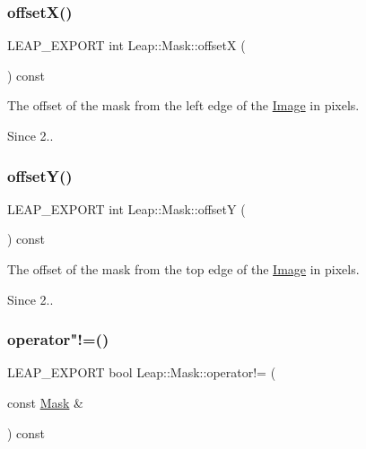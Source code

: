 \subsubsection{\texorpdfstring{offset\+X()}{offsetX()}}
{\footnotesize\ttfamily L\+E\+A\+P\+\_\+\+E\+X\+P\+O\+RT int Leap\+::\+Mask\+::offsetX (\begin{DoxyParamCaption}{ }\end{DoxyParamCaption}) const}

The offset of the mask from the left edge of the \hyperlink{class_leap_1_1_image}{Image} in pixels. 
\begin{DoxyCodeInclude}
\end{DoxyCodeInclude}
 \begin{DoxySince}{Since}
2.. 
\end{DoxySince}
\mbox{\label{class_leap_1_1_mask_ab39e76c8f416f1c7f00a6a40e3652753}} 
\subsubsection{\texorpdfstring{offset\+Y()}{offsetY()}}
{\footnotesize\ttfamily L\+E\+A\+P\+\_\+\+E\+X\+P\+O\+RT int Leap\+::\+Mask\+::offsetY (\begin{DoxyParamCaption}{ }\end{DoxyParamCaption}) const}

The offset of the mask from the top edge of the \hyperlink{class_leap_1_1_image}{Image} in pixels. 
\begin{DoxyCodeInclude}
\end{DoxyCodeInclude}
 \begin{DoxySince}{Since}
2.. 
\end{DoxySince}
\mbox{\label{class_leap_1_1_mask_ac73f5624c50061cd0c5a5c2f140c0830}} 
\subsubsection{\texorpdfstring{operator"!=()}{operator!=()}}
{\footnotesize\ttfamily L\+E\+A\+P\+\_\+\+E\+X\+P\+O\+RT bool Leap\+::\+Mask\+::operator!= (\begin{DoxyParamCaption}\item[{const \hyperlink{class_leap_1_1_mask}{Mask} \&}]{ }\end{DoxyParamCaption}) const}

